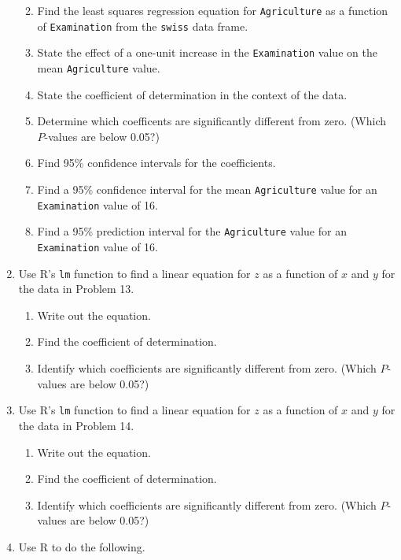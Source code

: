 \documentclass[
]{book}
\providecommand{\tightlist}{%
  \setlength{\itemsep}{0pt}\setlength{\parskip}{0pt}}
\theoremstyle{definition}
\theoremstyle{definition}
\theoremstyle{definition}
\theoremstyle{definition}
\theoremstyle{remark}
\begin{document}
\begin{enumerate}
  \begin{enumerate}
  \def\labelenumii{\alph{enumii}.}
  \tightlist
  \item
    Find the least squares regression equation for \texttt{Agriculture} as a function of \texttt{Examination} from the \texttt{swiss} data frame.
  \item
    State the effect of a one-unit increase in the \texttt{Examination} value on the mean \texttt{Agriculture} value.
  \item
    State the coefficient of determination in the context of the data.
  \item
    Determine which coefficents are significantly different from zero. (Which \(P\)-values are below 0.05?)
  \item
    Find 95\% confidence intervals for the coefficients.
  \item
    Find a 95\% confidence interval for the mean \texttt{Agriculture} value for an \texttt{Examination} value of 16.
  \item
    Find a 95\% prediction interval for the \texttt{Agriculture} value for an \texttt{Examination} value of 16.
  \end{enumerate}
\item
  Use R's \texttt{lm} function to find a linear equation for \(z\) as a function of \(x\) and \(y\) for the data in Problem 13.

  \begin{enumerate}
  \def\labelenumii{\alph{enumii}.}
  \tightlist
  \item
    Write out the equation.
  \item
    Find the coefficient of determination.
  \item
    Identify which coefficients are significantly different from zero. (Which \(P\)-values are below 0.05?)
  \end{enumerate}
\item
  Use R's \texttt{lm} function to find a linear equation for \(z\) as a function of \(x\) and \(y\) for the data in Problem 14.

  \begin{enumerate}
  \def\labelenumii{\alph{enumii}.}
  \tightlist
  \item
    Write out the equation.
  \item
    Find the coefficient of determination.
  \item
    Identify which coefficients are significantly different from zero. (Which \(P\)-values are below 0.05?)
  \end{enumerate}
\item
  Use R to do the following.


\end{enumerate}
\end{document}
